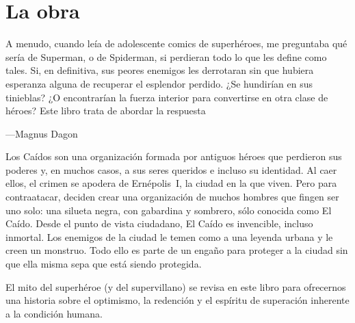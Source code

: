 \section*{La obra}
\begin{small}
	\epigraph{
		\lquoti A menudo, cuando leía de adolescente comics de superhéroes, me preguntaba qué sería de Superman, o de Spiderman, si perdieran todo lo que les define como tales. Si, en definitiva, sus peores enemigos les derrotaran sin que hubiera esperanza alguna de recuperar el esplendor perdido. ¿Se hundirían en sus tinieblas? ¿O encontrarían la fuerza interior para convertirse en otra clase de héroes? Este libro trata de abordar la respuesta\rquoti
	}{---Magnus Dagon}

	Los Caídos son una organización formada por antiguos héroes que perdieron sus poderes y, en muchos casos, a sus seres queridos e incluso su identidad. Al caer ellos, el crimen se apodera de Ernépolis~I, la ciudad en la que viven. Pero para contraatacar, deciden crear una organización de muchos hombres que fingen ser uno solo: una silueta negra, con gabardina y sombrero, sólo conocida como El Caído. Desde el punto de vista ciudadano, El Caído es invencible, incluso inmortal. Los enemigos de la ciudad le temen como a una leyenda urbana y le creen un monstruo. Todo ello es parte de un engaño para proteger a la ciudad sin que ella misma sepa que está siendo protegida.

	El mito del superhéroe (y del supervillano) se revisa en este libro para ofrecernos una historia sobre el optimismo, la redención y el espíritu de superación inherente a la condición humana.
\end{small}

\endinput
